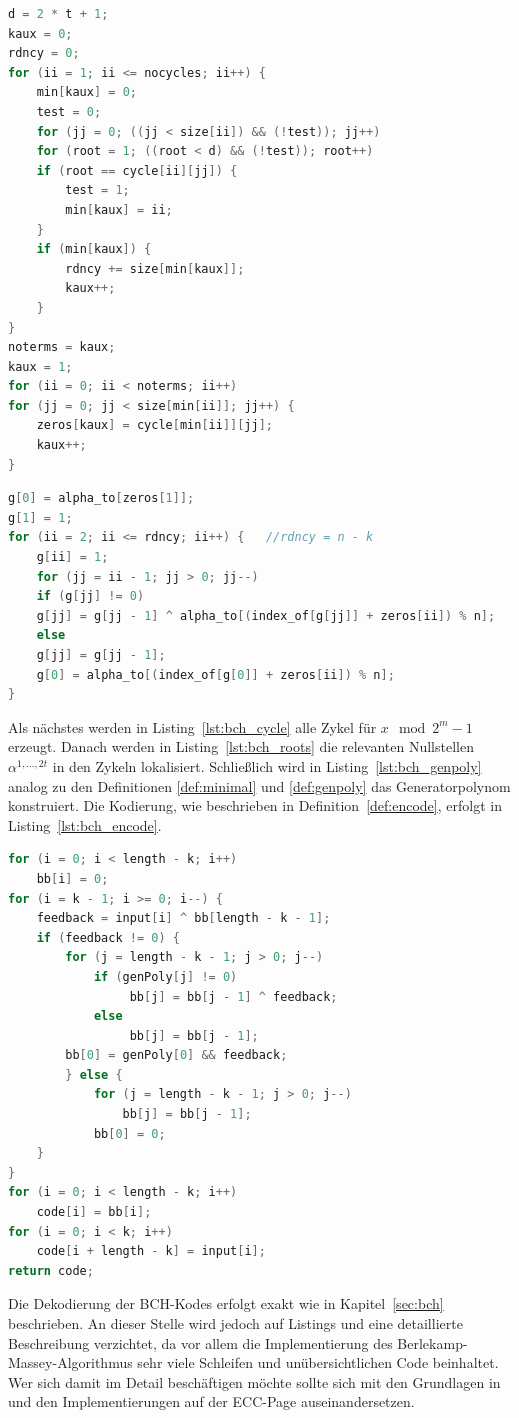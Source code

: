 \begin{lstlisting}[caption=Suchen der Nullstellen in den Zykeln, label={lst:bch_roots}, language=C++]
d = 2 * t + 1;
kaux = 0;
rdncy = 0;
for (ii = 1; ii <= nocycles; ii++) {
    min[kaux] = 0;
    test = 0;
    for (jj = 0; ((jj < size[ii]) && (!test)); jj++)
    for (root = 1; ((root < d) && (!test)); root++)
    if (root == cycle[ii][jj]) {
        test = 1;
        min[kaux] = ii;
    }
    if (min[kaux]) {
        rdncy += size[min[kaux]];
        kaux++;
    }
}
noterms = kaux;
kaux = 1;
for (ii = 0; ii < noterms; ii++)
for (jj = 0; jj < size[min[ii]]; jj++) {
    zeros[kaux] = cycle[min[ii]][jj];
    kaux++;
}
\end{lstlisting}

\begin{lstlisting}[caption=Konstruieren den Generatorpolynoms, label={lst:bch_genpoly}, language=C++]
g[0] = alpha_to[zeros[1]];
g[1] = 1;
for (ii = 2; ii <= rdncy; ii++) {	//rdncy = n - k
    g[ii] = 1;
    for (jj = ii - 1; jj > 0; jj--)
    if (g[jj] != 0)
    g[jj] = g[jj - 1] ^ alpha_to[(index_of[g[jj]] + zeros[ii]) % n];
    else
    g[jj] = g[jj - 1];
    g[0] = alpha_to[(index_of[g[0]] + zeros[ii]) % n];
}
\end{lstlisting}



Als nächstes werden in Listing~\ref{lst:bch_cycle} alle Zykel für $x \mod 2^m-1$ erzeugt. Danach werden in Listing~\ref{lst:bch_roots} die relevanten Nullstellen $\alpha^{1,...,2t}$ in den Zykeln lokalisiert. Schließlich wird in Listing~\ref{lst:bch_genpoly} analog zu den Definitionen \ref{def:minimal} und \ref{def:genpoly} das Generatorpolynom konstruiert. Die Kodierung, wie beschrieben in Definition~\ref{def:encode}, erfolgt in Listing~\ref{lst:bch_encode}.
\vspace{0.5cm}
\begin{lstlisting}[caption=Konstruieren den Generatorpolynoms, label={lst:bch_encode}, language=C++]
for (i = 0; i < length - k; i++)
	bb[i] = 0;
for (i = k - 1; i >= 0; i--) {
    feedback = input[i] ^ bb[length - k - 1];
    if (feedback != 0) {
        for (j = length - k - 1; j > 0; j--)
        	if (genPoly[j] != 0)
       			 bb[j] = bb[j - 1] ^ feedback;
        	else
       			 bb[j] = bb[j - 1];
        bb[0] = genPoly[0] && feedback;
        } else {
        	for (j = length - k - 1; j > 0; j--)
       			bb[j] = bb[j - 1];
        	bb[0] = 0;
    }
}
for (i = 0; i < length - k; i++)
	code[i] = bb[i];
for (i = 0; i < k; i++)
	code[i + length - k] = input[i];
return code;
\end{lstlisting}

Die Dekodierung der BCH-Kodes erfolgt exakt wie in Kapitel~\ref{sec:bch} beschrieben. An dieser Stelle wird jedoch auf Listings und eine detaillierte Beschreibung verzichtet, da vor allem die Implementierung des Berlekamp-Massey-Algorithmus sehr viele Schleifen und unübersichtlichen Code beinhaltet. Wer sich damit im Detail beschäftigen möchte sollte sich mit den Grundlagen in \cite[S. 54ff]{morelos2006art} und den Implementierungen auf der ECC-Page\cite{eccpage} auseinandersetzen.


